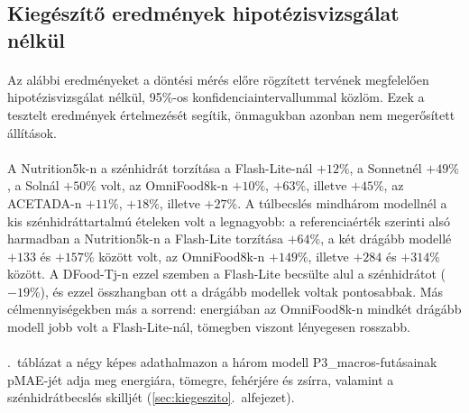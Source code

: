\subsection{Kiegészítő eredmények hipotézisvizsgálat nélkül}
\label{sec:leiro_eredmenyek}
\paragraph{}Az alábbi eredményeket a döntési mérés előre rögzített tervének megfelelően 
hipotézisvizsgálat nélkül, 95\%-os konfidenciaintervallummal közlöm. Ezek a tesztelt 
eredmények értelmezését segítik, önmagukban azonban nem megerősített állítások.
\paragraph{}A Nutrition5k-n a szénhidrát torzítása a Flash-Lite-nál $+12\%$, a Sonnetnél 
$+49\%$, a Solnál $+50\%$ volt, az OmniFood8k-n $+10\%$, $+63\%$, illetve $+45\%$, az ACETADA-n $+11\%$, $+18\%$, illetve $+27\%$. 
A túlbecslés mindhárom modellnél a kis szénhidráttartalmú ételeken volt a legnagyobb: a 
referenciaérték szerinti alsó harmadban a Nutrition5k-n a Flash-Lite torzítása $+64\%$, a két 
drágább modellé $+133$ és $+157\%$ között volt, az OmniFood8k-n $+149\%$, illetve $+284$ és 
$+314\%$ között. A DFood-Tj-n ezzel szemben a Flash-Lite becsülte alul a szénhidrátot 
($-19\%$), és ezzel összhangban ott a drágább modellek voltak pontosabbak. Más célmennyiségekben más a 
sorrend: energiában az OmniFood8k-n mindkét drágább modell jobb volt a Flash-Lite-nál, 
tömegben viszont lényegesen rosszabb.

\paragraph{}\Az{\ref{tab:kiegeszito_pmae}}.~táblázat a négy képes adathalmazon a három modell 
P3\_macros-futásainak pMAE-jét adja meg energiára, tömegre, fehérjére és zsírra, valamint 
a szénhidrátbecslés skilljét (\ref{sec:kiegeszito}.~alfejezet).

